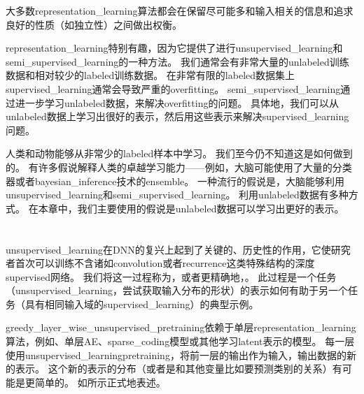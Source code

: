 
大多数\gls{representation_learning}算法都会在保留尽可能多和输入相关的信息和追求良好的性质（如独立性）之间做出权衡。


\gls{representation_learning}特别有趣，因为它提供了进行\gls{unsupervised_learning}和\gls{semi_supervised_learning}的一种方法。
我们通常会有非常大量的\gls{unlabeled}训练数据和相对较少的\gls{labeled}训练数据。
在非常有限的\gls{labeled}数据集上\gls{supervised_learning}通常会导致严重的\gls{overfitting}。
\gls{semi_supervised_learning}通过进一步学习\gls{unlabeled}数据，来解决\gls{overfitting}的问题。
具体地，我们可以从\gls{unlabeled}数据上学习出很好的表示，然后用这些表示来解决\gls{supervised_learning}问题。


人类和动物能够从非常少的\gls{labeled}样本中学习。
我们至今仍不知道这是如何做到的。
有许多假说解释人类的卓越学习能力——例如，大脑可能使用了大量的分类器或者\gls{bayesian_inference}技术的\gls{ensemble}。
一种流行的假说是，大脑能够利用\gls{unsupervised_learning}和\gls{semi_supervised_learning}。
利用\gls{unlabeled}数据有多种方式。
在本章中，我们主要使用的假说是\gls{unlabeled}数据可以学习出更好的表示。



\section{}
\label{sec:greedy_layer_wise_unsupervised_pretraining}
\gls{unsupervised_learning}在\gls{DNN}的复兴上起到了关键的、历史性的作用，它使研究者首次可以训练不含诸如\gls{convolution}或者\gls{recurrence}这类特殊结构的深度\gls{supervised}网络。
我们将这一过程称为，或者更精确地，。
此过程是一个任务（\gls{unsupervised_learning}，尝试获取输入分布的形状）的表示如何有助于另一个任务（具有相同输入域的\gls{supervised_learning}）的典型示例。


\gls{greedy_layer_wise_unsupervised_pretraining}依赖于单层\gls{representation_learning}算法，例如、单层\gls{AE}、\gls{sparse_coding}模型或其他学习\gls{latent}表示的模型。
每一层使用\gls{unsupervised_learning}\gls{pretraining}，将前一层的输出作为输入，输出数据的新的表示。
这个新的表示的分布（或者是和其他变量比如要预测类别的关系）有可能是更简单的。
如所示正式地表述。

